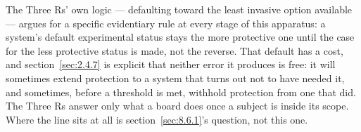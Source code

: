 The Three Rs' own logic — defaulting toward the least invasive option available — argues for a specific evidentiary rule at every stage of this apparatus: a system's default experimental status stays the more protective one until the case for the less protective status is made, not the reverse. That default has a cost, and section~\ref{sec:2.4.7} is explicit that neither error it produces is free: it will sometimes extend protection to a system that turns out not to have needed it, and sometimes, before a threshold is met, withhold protection from one that did. The Three Rs answer only what a board does once a subject is inside its scope. Where the line sits at all is section~\ref{sec:8.6.1}'s question, not this one.
